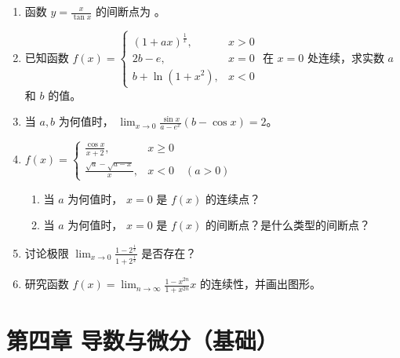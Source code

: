 \documentclass[12pt, a4paper]{article}
\begin{document}
\begin{enumerate}
    \item 函数 $ y=\frac{x}{\tan x} $ 的间断点为 \underline{\hspace{2cm}}。

    \item 已知函数 $ f(x)=\begin{cases}(1+ax)^{\frac{1}{x}}, & x>0\\ 2b-e, & x=0\\ b+\ln(1+x^{2}), & x<0\end{cases} $ 在 $x=0$ 处连续，求实数 $a$ 和 $b$ 的值。

    \item 当 $ a, b $ 为何值时， $ \lim_{x \to 0} \frac{\sin x}{a - e^{x}} (b - \cos x) = 2 $。

    \item $ f(x) = \begin{cases} \frac{\cos x}{x+2}, & x \geq 0 \\ \frac{\sqrt{a} - \sqrt{a - x}}{x}, & x < 0 \quad (a > 0) \end{cases} $
    \begin{enumerate}
        \item 当 $a$ 为何值时， $x=0$ 是 $ f(x) $ 的连续点？
        \item 当 $a$ 为何值时， $x=0$ 是 $ f(x) $ 的间断点？是什么类型的间断点？
    \end{enumerate}

    \item 讨论极限 $ \lim_{x \to 0} \frac{1 - 2^{\frac{1}{x}}}{1 + 2^{\frac{1}{x}}} $ 是否存在？

    \item 研究函数 $ f(x)=\lim_{n\to\infty}\frac{1-x^{2n}}{1+x^{2n}}x $ 的连续性，并画出图形。
\end{enumerate}

\section*{第四章 导数与微分（基础）}
\end{document}
